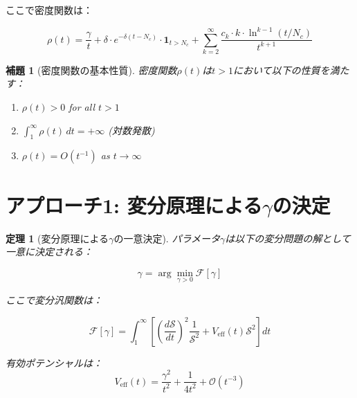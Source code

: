 \documentclass[12pt]{article}
\newtheorem{theorem}{定理}
\newtheorem{lemma}{補題}
\begin{document}
ここで密度関数は：

\begin{equation}
\rho(t) = \frac{\gamma}{t} + \delta \cdot e^{-\delta(t-N_c)} \cdot \mathbf{1}_{t > N_c} + \sum_{k=2}^{\infty} \frac{c_k \cdot k \cdot \ln^{k-1}(t/N_c)}{t^{k+1}}
\end{equation}

\begin{lemma}[密度関数の基本性質]
密度関数$\rho(t)$は$t > 1$において以下の性質を満たす：
\begin{enumerate}
\item $\rho(t) > 0$ for all $t > 1$
\item $\int_1^{\infty} \rho(t) \, dt = +\infty$ (対数発散)
\item $\rho(t) = O(t^{-1})$ as $t \to \infty$
\end{enumerate}
\end{lemma}

\section{アプローチ1: 変分原理による$\gamma$の決定}

\begin{theorem}[変分原理による$\gamma$の一意決定]
パラメータ$\gamma$は以下の変分問題の解として一意に決定される：

\begin{equation}
\gamma = \arg\min_{\gamma > 0} \mathcal{F}[\gamma]
\end{equation}

ここで変分汎関数は：

\begin{equation}
\mathcal{F}[\gamma] = \int_1^{\infty} \left[\left(\frac{d\mathcal{S}}{dt}\right)^2 \frac{1}{\mathcal{S}^2} + V_{\text{eff}}(t) \mathcal{S}^2\right] dt
\end{equation}

有効ポテンシャルは：
\begin{equation}
V_{\text{eff}}(t) = \frac{\gamma^2}{t^2} + \frac{1}{4t^2} + \mathcal{O}(t^{-3})
\end{equation}
\end{theorem}
\end{document}
